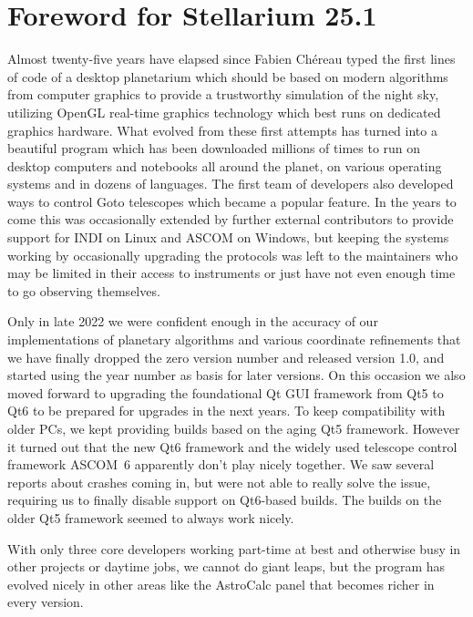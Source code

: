 
\chapter*{Foreword for Stellarium 25.1}
\label{ch:Foreword}


Almost  twenty-five years have elapsed since Fabien Ch\'ereau typed the
first lines of code of a desktop planetarium which should be based on
modern algorithms from computer graphics to provide a trustworthy
simulation of the night sky, utilizing OpenGL real-time graphics technology which best
runs on dedicated graphics hardware. What evolved from these first
attempts has turned into a beautiful program which has been
downloaded millions of times to run on desktop computers and notebooks
all around the planet, on various operating systems and in dozens of
languages. The first team of developers also developed ways to control Goto 
telescopes which became a popular feature. In the years to come this was occasionally 
extended by further external contributors to provide support for INDI on Linux and ASCOM on Windows, 
but keeping the systems working by occasionally upgrading the protocols was left to 
the maintainers who may be limited in their access to instruments or just have 
not even enough time to go observing themselves.  


Only in late 2022 we were confident enough in the accuracy of our implementations of planetary 
algorithms and various coordinate refinements that we have finally dropped the zero version number and 
released version 1.0, and started using the year number as basis for later versions. 
On this occasion we also moved forward to upgrading the foundational Qt GUI framework from Qt5 to Qt6 
to be prepared for upgrades in the next years. To keep compatibility with older PCs, 
we kept providing  builds based on the aging Qt5 framework. 
However it turned out that the new Qt6 framework and the widely used telescope 
control framework ASCOM~6 apparently don't play nicely together. We saw several reports about crashes coming in, 
but were not able to really solve the issue, requiring us to finally disable support on Qt6-based builds. 
The builds on the older Qt5 framework seemed to always work nicely. 



With only three core developers working part-time at best and otherwise busy in other projects or daytime jobs, 
we cannot do giant leaps, but the program has 
evolved nicely in other areas like the AstroCalc panel that becomes richer in every version. 



